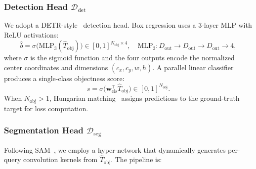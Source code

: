 \subsubsection{Detection Head $\mathcal{D}_\text{det}$}
We adopt a DETR-style~\cite{DETR} detection head.
Box regression uses a 3-layer MLP with ReLU activations:
\begin{equation}
  \hat{b} = \sigma\!\bigl(\text{MLP}_3(\hat{T}_\text{obj})\bigr)
           \in [0,1]^{N_\text{obj}\times 4},
  \quad
  \text{MLP}_3: D_\text{out}\to D_\text{out}\to D_\text{out}\to 4,
\end{equation}
where $\sigma$ is the sigmoid function and the four outputs encode the
normalized center coordinates and dimensions $(c_x, c_y, w, h)$.
A parallel linear classifier produces a single-class objectness score:
\begin{equation}
  s = \sigma\!\bigl(\mathbf{w}_\text{cls}^\top \hat{T}_\text{obj}\bigr)
    \in [0,1]^{N_\text{obj}}.
\end{equation}
When $N_\text{obj}>1$, Hungarian matching~\cite{DETR} assigns predictions to
the ground-truth target for loss computation.

\subsubsection{Segmentation Head $\mathcal{D}_\text{seg}$}
Following SAM~\cite{SAM}, we employ a hyper-network that
dynamically generates per-query convolution kernels from $\hat{T}_\text{obj}$.
The pipeline is:

